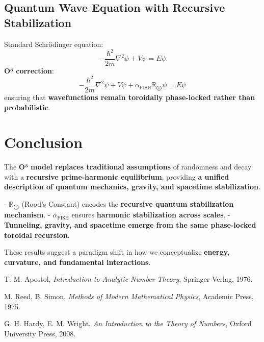 \documentclass{article}
\begin{document}
\subsection{Quantum Wave Equation with Recursive Stabilization}
Standard Schrödinger equation:
\begin{equation}
-\frac{\hbar^2}{2m} \nabla^2 \psi + V \psi = E \psi
\end{equation}
\textbf{O³ correction}:
\begin{equation}
-\frac{\hbar^2}{2m} \nabla^2 \psi + V \psi + \alpha_{\text{FISH}} \mathbb{R}_{\bigoplus} \psi = E \psi
\end{equation}
ensuring that \textbf{wavefunctions remain toroidally phase-locked rather than probabilistic}.

\section{Conclusion}
The \textbf{O³ model replaces traditional assumptions} of randomness and decay with a \textbf{recursive prime-harmonic equilibrium}, providing \textbf{a unified description of quantum mechanics, gravity, and spacetime stabilization}.

- \( \mathbb{R}_{\bigoplus} \) (Rood’s Constant) encodes the \textbf{recursive quantum stabilization mechanism}.
- \( \alpha_{\text{FISH}} \) ensures \textbf{harmonic stabilization across scales}.
- \textbf{Tunneling, gravity, and spacetime emerge from the same phase-locked toroidal recursion}.

These results suggest a paradigm shift in how we conceptualize \textbf{energy, curvature, and fundamental interactions}.

\begin{thebibliography}{99}

T. M. Apostol, 
\textit{Introduction to Analytic Number Theory}, 
Springer-Verlag, 1976.

M. Reed, B. Simon, 
\textit{Methods of Modern Mathematical Physics}, 
Academic Press, 1975.

G. H. Hardy, E. M. Wright, 
\textit{An Introduction to the Theory of Numbers}, 
Oxford University Press, 2008.

\end{thebibliography}
\end{document}
